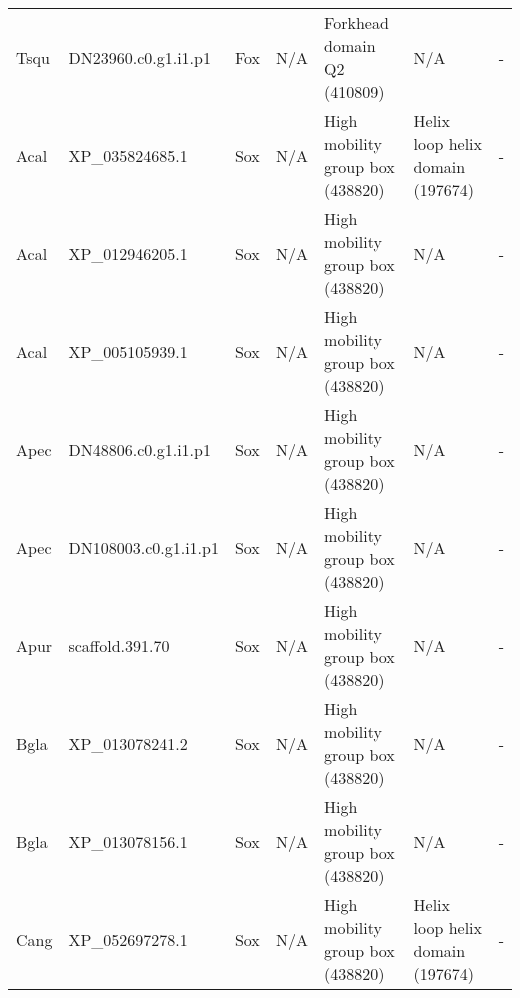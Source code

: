 \documentclass[../main.tex]{subfiles}
\begin{document}
\begin{landscape}
\begin{longtable}{lllllll}
		Tsqu           & DN23960.c0.g1.i1.p1   & Fox            & N/A                 & Forkhead domain Q2 (410809)                 & N/A                                                                    & -                    \\
		Acal           & XP\_035824685.1       & Sox            & N/A                 & High mobility group box (438820)            & Helix loop helix domain (197674)                                       & -                    \\
		Acal           & XP\_012946205.1       & Sox            & N/A                 & High mobility group box (438820)            & N/A                                                                    & -                    \\
		Acal           & XP\_005105939.1       & Sox            & N/A                 & High mobility group box (438820)            & N/A                                                                    & -                    \\
		Apec           & DN48806.c0.g1.i1.p1   & Sox            & N/A                 & High mobility group box (438820)            & N/A                                                                    & -                    \\
		Apec           & DN108003.c0.g1.i1.p1  & Sox            & N/A                 & High mobility group box (438820)            & N/A                                                                    & -                    \\
		Apur           & scaffold.391.70       & Sox            & N/A                 & High mobility group box (438820)            & N/A                                                                    & -                    \\
		Bgla           & XP\_013078241.2       & Sox            & N/A                 & High mobility group box (438820)            & N/A                                                                    & -                    \\
		Bgla           & XP\_013078156.1       & Sox            & N/A                 & High mobility group box (438820)            & N/A                                                                    & -                    \\
		Cang           & XP\_052697278.1       & Sox            & N/A                 & High mobility group box (438820)            & Helix loop helix domain (197674)                                       & -                    \\

\end{longtable}
\end{landscape}
\end{document}
